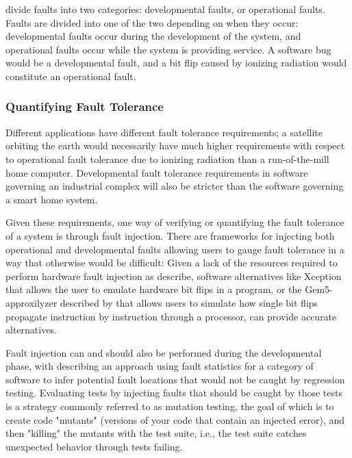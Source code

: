 \citet{avizienis2004basic} divide faults into two categories: developmental faults, or operational faults. Faults are divided into one of the two depending on when they occur: developmental faults occur during the development of the system, and operational faults occur while the system is providing service. A software bug would be a developmental fault, and a bit flip caused by ionizing radiation would constitute an operational fault.

\subsubsection{Quantifying Fault Tolerance}
\label{section:Verifying_fault_tolerance}

Different applications have different fault tolerance requirements; a satellite orbiting the earth would necessarily have much higher requirements with respect to operational fault tolerance due to ionizing radiation than a run-of-the-mill home computer. Developmental fault tolerance requirements in software governing an industrial complex will also be stricter than the software governing a smart home system. 

Given these requirements, one way of verifying or quantifying the fault tolerance of a system is through fault injection. There are frameworks for injecting both operational and developmental faults allowing users to gauge fault tolerance in a way that otherwise would be difficult: Given a lack of the resources required to perform hardware fault injection as \citet{arlat1993fault} describe, software alternatives like Xception~\citep{carreira1998xception} that allows the user to emulate hardware bit flips in a program, or the Gem5-approxilyzer described by \citet{venkatagiri2019gem5} that allows users to simulate how single bit flips propagate instruction by instruction through a processor, can provide accurate alternatives.

Fault injection can and should also be performed during the developmental phase, with \citet{natella2012fault} describing an approach using fault statistics for a category of software to infer potential fault locations that would not be caught by regression testing. Evaluating tests by injecting faults that should be caught by those tests is a strategy commonly referred to as mutation testing, the goal of which is to create code "mutants" (versions of your code that contain an injected error), and then "killing" the mutants with the test suite, i.e.,  the test suite catches unexpected behavior through tests failing.

